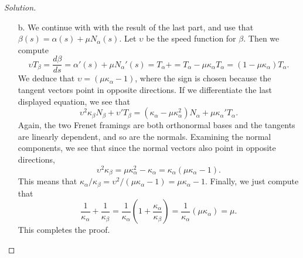 \documentclass[Shifrin_Solutions_Spring_2018]{subfiles}
\begin{document}
\begin{proof}[Solution]
\begin{itemize}
\item[b.] We continue with with the result of the last part, and use that $\beta(s) = \alpha(s) + \mu N_{\alpha}(s)$. Let $\upsilon$ be the speed function for $\beta$. Then we compute
\[
\upsilon T_{\beta} = \dfrac{d\beta}{ds} = \alpha'(s) + \mu N_{\alpha}'(s) = T_{\alpha} +  = T_{\alpha} -\mu\kappa_{\alpha}T_{\alpha}  = (1 - \mu \kappa_{\alpha} ) T_{\alpha}.
\]
We deduce that  $\upsilon = (\mu \kappa_{\alpha} - 1)$, where the sign is chosen because the tangent vectors point in opposite directions.  If we differentiate the last displayed equation, we see that
\[
\upsilon^2 \kappa_{\beta} N_{\beta} + \upsilon' T_{\beta} = (\kappa_{\alpha} - \mu \kappa_{\alpha}^2) N_{\alpha} + \mu \kappa_{\alpha}' T_{\alpha} .
\]
Again, the two Frenet framings are both orthonormal bases and the tangents are linearly dependent, and so are the normals. Examining the normal components, we see that  since the normal vectors also point in opposite directions,
\[
\upsilon^2 \kappa_{\beta} = \mu \kappa_{\alpha}^2 - \kappa_{\alpha} = \kappa_{\alpha} ( \mu \kappa_{\alpha} - 1) .
\]
This means that $\kappa_{\alpha}/\kappa_{\beta} = \upsilon^2 / (\mu \kappa_{\alpha} - 1) = \mu \kappa_{\alpha} - 1$. Finally, we just compute that
\[
\dfrac{1}{\kappa_{\alpha}} + \dfrac{1}{\kappa_{\beta}} = \dfrac{1}{\kappa_{\alpha}} \left( 1 + \dfrac{\kappa_{\alpha}}{\kappa_{\beta}} \right) = \dfrac{1}{\kappa_{\alpha}} ( \mu \kappa_{\alpha} ) = \mu .
\]
This completes the proof.
\end{itemize}
\end{proof}

\vspace{.5cm}

\end{document}

